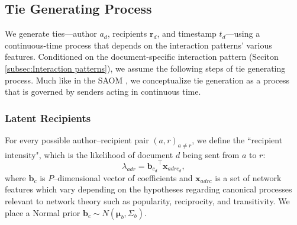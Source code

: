 \documentclass{article}
\begin{document}
\subsection{Tie Generating Process}\label{subsec:Tie generating process}
We generate ties---author $a_d$, recipients $\boldsymbol{r}_d$, and timestamp $t_d$---using a continuous-time process
that depends on the interaction patterns' various features. Conditioned on the document-specific interaction pattern (Seciton \ref{subsec:Interaction patterns}), we assume the following steps of tie generating process. Much like in the SAOM \cite{snijders2010introduction}, we conceptualize tie generation as a process that is governed by senders acting in continuous time. 

\subsubsection{Latent Recipients}\label{subsubsec:Hypothetical Recipients}
For every possible author--recipient pair $(a,r)_{a \neq r}$, we define the ``recipient intensity", which is the likelihood of document $d$ being sent from $a$ to $r$:
\begin{equation}
\lambda_{adr} = {\boldsymbol{b}_{c_d}}^{\top}\boldsymbol{x}_{adrc_d},
\end{equation}
where $\boldsymbol{b}_c$ is $P$--dimensional vector of coefficients and $\boldsymbol{x}_{adrc}$ is a set of network features which vary depending on the hypotheses regarding canonical processes relevant to network theory such as popularity, reciprocity, and transitivity. We place a Normal prior $\boldsymbol{b}_c \sim N(\boldsymbol{\mu}_b, \Sigma_b)$.
\end{document}

